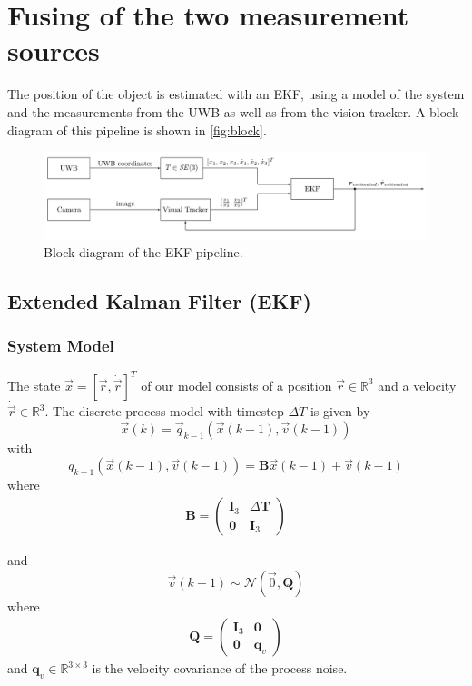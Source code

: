 \chapter{Fusing of the two measurement sources}\label{ch:fusing}

The position of the object is estimated with an \acf{EKF}, using a model of the system and the measurements from the \ac{UWB} as well as from the vision tracker. A block diagram of this pipeline is shown in \autoref{fig:block}.

\begin{figure}[h]\centering
	\includegraphics[width=1.0\textwidth]{figures/blockdiagram_setup}
	\caption{Block diagram of the \ac{EKF} pipeline.}\label{fig:block}
\end{figure}

\section{Extended Kalman Filter (EKF)}

\subsection{System Model}
The state $\vec x = [\vec r, \dot{\vec{r}}]^T$ of our model consists of a position $\vec r \in \mathbb{R}^3$ and a velocity $\dot{\vec r} \in \mathbb{R}^3$.
The discrete process model with timestep $\Delta T$ is given by
\begin{equation}
	\vec x(k) = \vec q_{k-1}(\vec x(k-1), \vec v(k-1))
\end{equation}
with
\begin{equation}
  q_{k-1}(\vec x(k-1), \vec v(k-1)) = \textbf{B} \vec x(k-1) + \vec v(k-1)
\end{equation}
where 
\begin{align}
	\textbf{B} =
	\begin{pmatrix}
		\textbf{I}_3 & \Delta \textbf{T}\\
		\textbf{0} & \textbf{I}_3
	\end{pmatrix}
\end{align} 

and
\begin{equation}
	\vec v(k-1) \sim \mathcal{N}(\vec 0, \textbf{Q})
\end{equation}
where
\begin{align}
	\textbf{Q} =
	\begin{pmatrix}
		\textbf{I}_3 & \textbf{0}\\
		\textbf{0} & \textbf{q}_v
	\end{pmatrix}
\end{align}
and $\textbf{q}_v \in \mathbb{R}^{3\times3}$ is the velocity covariance of the process noise.

